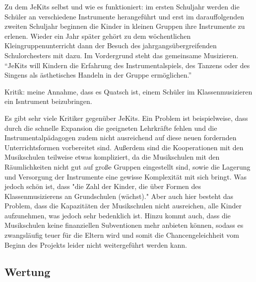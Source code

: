 Zu dem JeKits selbst und wie es funktioniert: im ersten Schuljahr werden die
Schüler an verschiedene Instrumente herangeführt und erst im darauffolgenden
zweiten Schuljahr beginnen die Kinder in kleinen Gruppen ihre Instrumente zu
erlenen. Wieder ein Jahr später gehört zu dem wöchentlichen
Kleingruppenunterricht dann der Besuch des jahrgangsübergreifenden
Schulorchesters mit dazu. Im Vordergrund steht das gemeinsame Musizieren.
\enquote{JeKits will Kindern die Erfahrung des Instrumentalspiels, des Tanzens
oder des Singens als ästhetisches Handeln in der Gruppe ermöglichen.}



Kritik: meine Annahme, dass es Quatsch ist, einem Schüler im Klassenmusizieren
ein Isntrument beizubringen.

Es gibt sehr viele Kritiker gegenüber JeKits. Ein Problem ist beispielweise,
dass durch die schnelle Expansion die geeigneten Lehrkräfte fehlen und die
Instrumentalpädagogen zudem nicht ausreichend auf diese neuen fordernden
Unterrichtsformen vorbereitet sind. Außerdem sind die Kooperationen mit den
Musikschulen teilweise etwas kompliziert, da die Musikschulen mit den
Räumlichkeiten nicht gut auf große Gruppen eingestellt sind, sowie die Lagerung
und Versorgung der Instrumente eine gewisse Komplexität mit sich bringt. Was
jedoch schön ist, dass "die Zahl der Kinder, die über Formen des
Klassenmusizierens an Grundschulen (wächst)." %
Aber auch hier besteht das Problem, dass die Kapazitäten der Musikschulen
nicht ausreichen, alle Kinder aufzunehmen, was jedoch sehr bedenklich ist. Hinzu
kommt auch, dass die Musikschulen keine finanziellen Subventionen mehr anbieten
können, sodass es zwangsläufig teuer für die Eltern wird und somit die
Chancengeleichheit vom Beginn des Projekts leider nicht weitergeführt werden
kann.






\subsection{Wertung}

